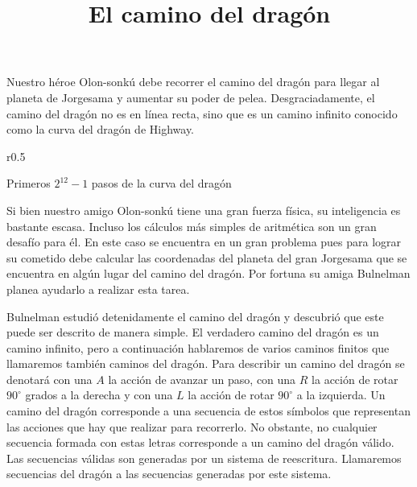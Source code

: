 \documentclass{oci}
\title{El camino del drag\'on}
\begin{document}
\maketitle
Nuestro héroe Olon-sonkú debe recorrer el camino del dragón para llegar al planeta de Jorgesama y aumentar su poder de pelea. Desgraciadamente, el camino del dragón no es en línea recta, sino que es un camino infinito conocido como la curva del dragón de Highway.


\begin{wrapfigure}{r}{0.5\textwidth}
	\begin{center}
			
		Primeros $2^{12}-1$ pasos de la curva del dragón
	\end{center}
\end{wrapfigure}

Si bien nuestro amigo Olon-sonkú tiene una gran fuerza física, su inteligencia es bastante escasa.
Incluso los cálculos más simples de aritmética son un gran desafío para él.
En este caso se encuentra en un gran problema pues para lograr su cometido debe calcular las coordenadas del planeta del gran Jorgesama que se encuentra en algún lugar del camino del dragón.
Por fortuna su amiga Bulnelman planea ayudarlo a realizar esta tarea.

Bulnelman estudió detenidamente el camino del dragón y descubrió que este puede ser descrito de manera simple.
El verdadero camino del dragón es un camino infinito, pero a continuación hablaremos de varios caminos finitos que llamaremos también caminos del dragón.
Para describir un camino del dragón se denotará con una $A$ la acción de avanzar un paso, con una $R$ la acción de rotar $90^{\circ}$ grados a la derecha y con una $L$ la acción de rotar $90^{\circ}$ a la izquierda.
Un camino del dragón corresponde a una secuencia de estos símbolos que representan las acciones que hay que realizar para recorrerlo.
No obstante, no cualquier secuencia formada con estas letras corresponde a un camino del dragón válido.
Las secuencias válidas son generadas por un sistema de reescritura.
Llamaremos secuencias del dragón a las secuencias generadas por este sistema.
\end{document}

